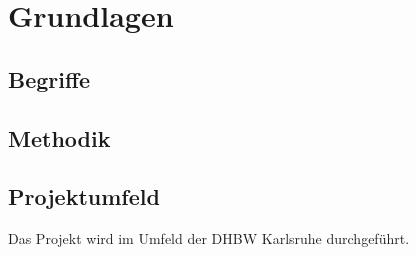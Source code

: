 \chapter{Grundlagen}

\section{Begriffe}

\section{Methodik}

\section{Projektumfeld}

Das Projekt wird im Umfeld der \gls{DHBW} Karlsruhe durchgeführt.
